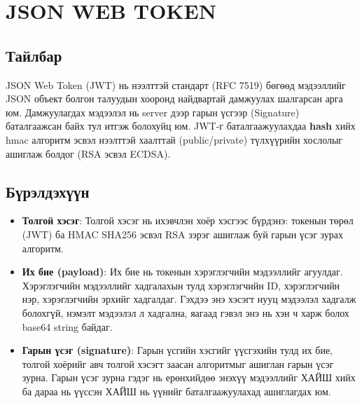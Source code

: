 \section{JSON WEB TOKEN}
\subsection{Тайлбар}
JSON Web Token (JWT) нь нээлттэй стандарт (RFC 7519) бөгөөд мэдээллийг JSON объект болгон талуудын хооронд найдвартай дамжуулах шалгарсан арга юм. Дамжуулагдах мэдээлэл нь server дээр гарын үсгээр (Signature) баталгаажсан байх тул итгэж болохуйц юм. JWT-г баталгаажуулахдаа \textbf{hash} хийх hmac алгоритм эсвэл нээлттэй хаалттай (public/private) түлхүүрийн хослолыг ашиглаж болдог (RSA эсвэл ECDSA).

\subsection{Бүрэлдэхүүн}
\begin{itemize}
	\item \textbf{Толгой хэсэг}: Толгой хэсэг нь ихэвчлэн хоёр хэсгээс бүрдэнэ: токенын төрөл (JWT) ба HMAC SHA256 эсвэл RSA зэрэг ашиглаж буй гарын үсэг зурах алгоритм.
	\item \textbf{Их бие (payload)}: Их бие нь токенын хэрэглэгчийн мэдээллийг агуулдаг. Хэрэглэгчийн мэдээллийг хадгалахын тулд хэрэглэгчийн ID, хэрэглэгчийн нэр, хэрэглэгчийн эрхийг хадгалдаг. Гэхдээ энэ хэсэгт нууц мэдээлэл хадгалж болохгүй, нэмэлт мэдээлэл л хадгална, яагаад гэвэл энэ нь хэн ч харж болох base64 string байдаг.
	\item \textbf{Гарын үсэг (signature)}: Гарын үсгийн хэсгийг үүсгэхийн тулд их бие, толгой хоёрийг авч толгой хэсэгт заасан алгоритмыг ашиглан гарын үсэг зурна. Гарын үсэг зурна гэдэг нь ерөнхийдөө энэхүү мэдээллийг ХАЙШ хийх ба дараа нь үүссэн ХАЙШ нь үүнийг баталгаажуулахад ашиглагдах юм.
\end{itemize}

